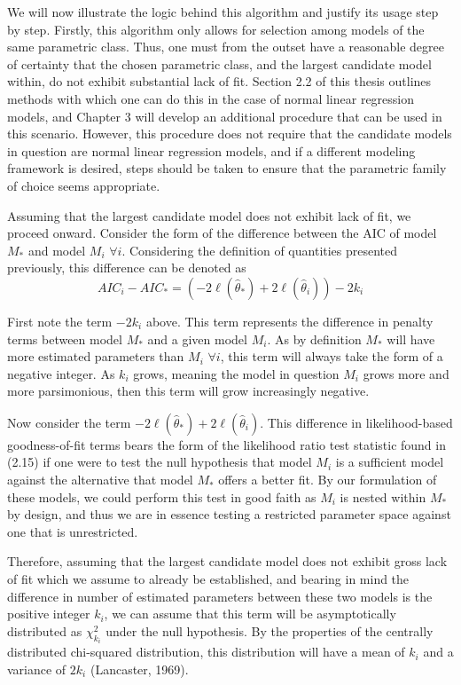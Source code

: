 		We will now illustrate the logic behind this algorithm and justify its usage step by step. Firstly, this algorithm only allows for selection among models of the
		same parametric class. Thus, one must from the outset have a reasonable degree of certainty that the chosen parametric class, and the largest candidate model
		within, do not exhibit substantial lack of fit. Section 2.2 of this thesis outlines methods with which one can do this in the case of normal linear regression
		models, and Chapter 3 will develop an additional procedure that can be used in this scenario. However, this procedure does not require that the candidate models
		in question are normal linear regression models, and if a different modeling framework is desired, steps should be taken to ensure that the parametric family
		of choice seems appropriate.

		Assuming that the largest candidate model does not exhibit lack of fit, we proceed onward. Consider the form of the difference between the AIC of model $M_*$
		and model $M_i$ $\forall i$. Considering the definition of quantities presented previously, this difference can be denoted as
		\begin{equation}
			AIC_i - AIC_* = \left( -2 \ell (\hat{\theta}_*) + 2 \ell (\hat{\theta}_i) \right) - 2k_i
		\end{equation}

		First note the term $-2k_i$ above. This term represents the difference in penalty terms between model $M_*$ and a given model $M_i$. As by definition
		$M_*$ will have more estimated parameters than $M_i$ $\forall i$, this term will always take the form of a negative integer. As $k_i$ grows, meaning
		the model in question $M_i$ grows more and more parsimonious, then this term will grow increasingly negative.

		Now consider the term $-2 \ell (\hat{\theta}_*) + 2 \ell (\hat{\theta}_i)$. This difference in likelihood-based goodness-of-fit terms bears the form
		of the likelihood ratio test statistic found in (2.15) if one were to test the null hypothesis that model $M_i$ is a sufficient model against the alternative that
		model $M_*$ offers a better fit. By our formulation of these models, we could perform this test in good faith as $M_i$ is nested within $M_*$ by 
		design, and thus we are in essence testing a restricted parameter space against one that is unrestricted.

		Therefore, assuming that the largest candidate model does not exhibit gross lack of fit which we assume to already be established, and bearing in mind the
		difference in number of estimated parameters between these two models is the positive integer $k_i$, we can assume that this term will be asymptotically distributed as
		$\chi^2_{k_i}$ under the null hypothesis. By the properties of the centrally distributed chi-squared distribution, this distribution will have a mean of $k_i$ and
		a variance of $2 k_i$ (Lancaster, 1969).

